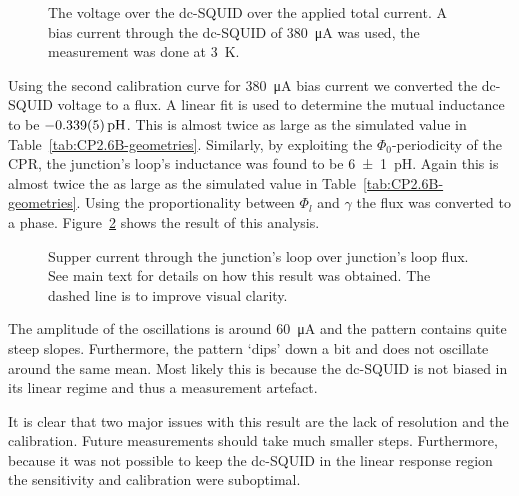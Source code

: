 \begin{figure}[ht!]
	\centering
	
	\caption{The voltage over the dc-SQUID over the applied total current. A bias current through the dc-SQUID of \qty{380}{\micro\ampere} was used, the measurement was done at \qty{3}{\kelvin}.}
	\label{fig:CP2.6B_SQUID_voltage_over_total_current}
\end{figure}

Using the second calibration curve for \qty{380}{\micro\ampere} bias current we converted the dc-SQUID voltage to a flux. A linear fit is used to determine the mutual inductance to be $\qty{-0.339\pm0.005}{\pico\henry}$. This is almost twice as large as the simulated value in Table~\ref{tab:CP2.6B-geometries}. Similarly, by exploiting the $\Phi_0$-periodicity of the CPR, the junction's loop's inductance was found to be \qty{6\pm1}{\pico\henry}. Again this is almost twice the as large as the simulated value in Table~\ref{tab:CP2.6B-geometries}. Using the proportionality between $\Phi_l$ and $\gamma$ the flux was converted to a phase. Figure~\ref{fig:CP2.6B_super_current_over_phase} shows the result of this analysis.

\begin{figure}[ht!]
	\centering
	
	\caption{Supper current through the junction's loop over junction's loop flux. See main text for details on how this result was obtained. The dashed line is to improve visual clarity.}
	\label{fig:CP2.6B_super_current_over_phase}
\end{figure}

The amplitude of the oscillations is around \qty{60}{\micro\ampere} and the pattern contains quite steep slopes. Furthermore, the pattern `dips' down a bit and does not oscillate around the same mean. Most likely this is because the dc-SQUID is not biased in its linear regime and thus a measurement artefact.

It is clear that two major issues with this result are the lack of resolution and the calibration. Future measurements should take much smaller steps. Furthermore, because it was not possible to keep the dc-SQUID in the linear response region the sensitivity and calibration were suboptimal. 